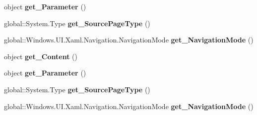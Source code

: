 \begin{DoxyCompactItemize}
\item 
\mbox{\label{interface_windows_1_1_u_i_1_1_xaml_1_1_navigation_1_1_i_navigation_event_args_aee2399db790c7ded1a3d517b16cf1565}} 
object {\bfseries get\+\_\+\+Parameter} ()
\item 
\mbox{\label{interface_windows_1_1_u_i_1_1_xaml_1_1_navigation_1_1_i_navigation_event_args_ac9be56f9222f1792a7cfaec765f29028}} 
global\+::\+System.\+Type {\bfseries get\+\_\+\+Source\+Page\+Type} ()
\item 
\mbox{\label{interface_windows_1_1_u_i_1_1_xaml_1_1_navigation_1_1_i_navigation_event_args_afd6b094e858b9b03320c2320a9b27f6c}} 
global\+::\+Windows.\+U\+I.\+Xaml.\+Navigation.\+Navigation\+Mode {\bfseries get\+\_\+\+Navigation\+Mode} ()
\item 
\mbox{\label{interface_windows_1_1_u_i_1_1_xaml_1_1_navigation_1_1_i_navigation_event_args_a3c11816e887751b9b6b55f442d6a56fb}} 
object {\bfseries get\+\_\+\+Content} ()
\item 
\mbox{\label{interface_windows_1_1_u_i_1_1_xaml_1_1_navigation_1_1_i_navigation_event_args_aee2399db790c7ded1a3d517b16cf1565}} 
object {\bfseries get\+\_\+\+Parameter} ()
\item 
\mbox{\label{interface_windows_1_1_u_i_1_1_xaml_1_1_navigation_1_1_i_navigation_event_args_ac9be56f9222f1792a7cfaec765f29028}} 
global\+::\+System.\+Type {\bfseries get\+\_\+\+Source\+Page\+Type} ()
\item 
\mbox{\label{interface_windows_1_1_u_i_1_1_xaml_1_1_navigation_1_1_i_navigation_event_args_afd6b094e858b9b03320c2320a9b27f6c}} 
global\+::\+Windows.\+U\+I.\+Xaml.\+Navigation.\+Navigation\+Mode {\bfseries get\+\_\+\+Navigation\+Mode} ()
\item 

\end{DoxyCompactItemize}
